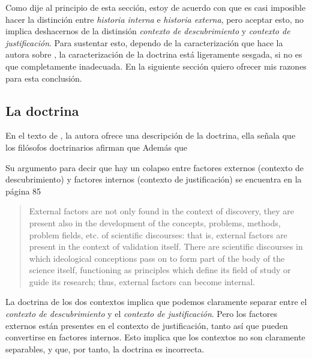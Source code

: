 Como dije al principio de esta sección, estoy de acuerdo con que es casi imposible hacer la distinción entre \emph{historia interna} e \emph{historia externa}, pero aceptar esto, no implica deshacernos de la distinsión \emph{contexto de descubrimiento} y \emph{contexto de justificación}.
Para sustentar esto, dependo de la caracterización que hace la autora sobre , la caracterización de la doctrina está ligeramente sesgada, si no es que completamente inadecuada.
En la siguiente sección quiero ofrecer mis razones para esta conclusión.

\subsection{La doctrina}

\noindent En el texto de \textcite[p.75]{Yturbe1995}, la autora ofrece una descripción de la doctrina, ella señala que los filósofos doctrinarios afirman que 
Además que 


Su argumento para decir que hay un colapso entre factores externos (contexto de descubrimiento) y factores internos (contexto de justificación) se encuentra en la página 85

\begin{quote}

	External factors are not only found in the context of discovery, they are present also in the development of the concepts, problems, methods, problem fields, etc. of scientific discourses: that is, external factors are present in the context of validation itself.
	There are scientific discourses in which ideological conceptions pass on to form part of the body of the science itself, functioning as principles which define its field of study or guide its research; thus, external factors can become internal.

\end{quote}

La doctrina de los dos contextos implica que podemos claramente separar entre el \emph{contexto de descubrimiento} y el \emph{contexto de justificación}.
Pero los factores externos están presentes en el contexto de justificación, tanto así que pueden convertirse en factores internos.
Esto implica que los contextos no son claramente separables, y que, por tanto, la doctrina es incorrecta.

